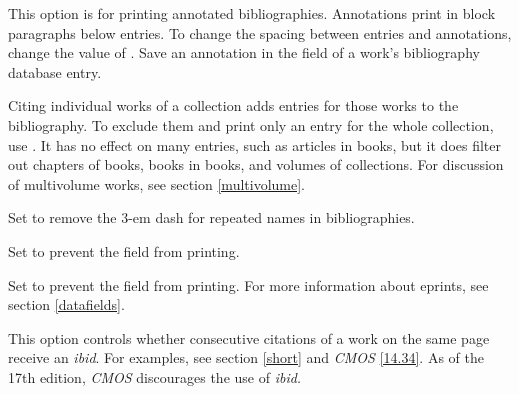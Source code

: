 \documentclass[11pt,letterpaper,oneside]{article}
\begin{document}
\begin{optionlist}


\noindent This option is for printing annotated bibliographies.
Annotations print in block paragraphs below entries. To change
the spacing between entries and annotations, change the value of
. Save an annotation in the 
field of a work's bibliography database entry.


\noindent Citing individual works of a collection adds entries for
those works to the bibliography. To exclude them and print only an
entry for the whole collection, use . It has no effect
on many  entries, such as articles in books, but
it does filter out chapters of books, books in books, and volumes of
collections. For discussion of multivolume works, see section
\ref{multivolume}.


\noindent Set  to remove the 3-em dash for repeated names
in bibliographies.


\noindent Set  to prevent the  field from
printing.


\noindent Set  to prevent the  field from
printing. For more information about eprints, see section
\ref{datafields}.


\noindent This option controls whether consecutive citations of a work
on the same page receive an \textit{ibid}. For examples, see section
\ref{short} and \textit{CMOS} \ref{14.34}. As of the 17th edition,
\textit{CMOS} discourages the use of \textit{ibid.}




\end{optionlist}
\end{document}
